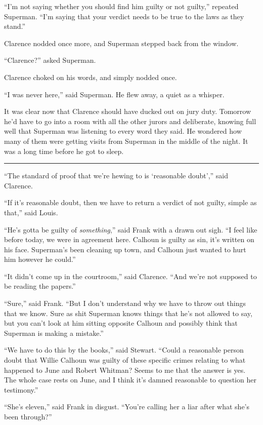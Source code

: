 \documentclass[ebook,12pt]{memoir}
\begin{document}
``I'm not saying whether you should find him guilty or not guilty,''
repeated Superman. ``I'm saying that your verdict needs to be true to
the laws as they stand.''

Clarence nodded once more, and Superman stepped back from the window.

``Clarence?'' asked Superman.

Clarence choked on his words, and simply nodded once.

``I was never here,'' said Superman. He flew away, a quiet as a whisper.

It was clear now that Clarence should have ducked out on jury duty.
Tomorrow he'd have to go into a room with all the other jurors and
deliberate, knowing full well that Superman was listening to every word
they said. He wondered how many of them were getting visits from
Superman in the middle of the night. It was a long time before he got to
sleep.

\begin{center}\rule{0.5\linewidth}{\linethickness}\end{center}

``The standard of proof that we're hewing to is `reasonable doubt',''
said Clarence.

``If it's reasonable doubt, then we have to return a verdict of not
guilty, simple as that,'' said Louis.

``He's gotta be guilty of \emph{something},'' said Frank with a drawn
out sigh. ``I feel like before today, we were in agreement here. Calhoun
is guilty as sin, it's written on his face. Superman's been cleaning up
town, and Calhoun just wanted to hurt him however he could.''

``It didn't come up in the courtroom,'' said Clarence. ``And we're not
supposed to be reading the papers.''

``Sure,'' said Frank. ``But I don't understand why we have to throw out
things that we know. Sure as shit Superman knows things that he's not
allowed to say, but you can't look at him sitting opposite Calhoun and
possibly think that Superman is making a mistake.''

``We have to do this by the books,'' said Stewart. ``Could a reasonable
person doubt that Willie Calhoun was guilty of these specific crimes
relating to what happened to June and Robert Whitman? Seems to me that
the answer is yes. The whole case rests on June, and I think it's damned
reasonable to question her testimony.''

``She's eleven,'' said Frank in disgust. ``You're calling her a liar
after what she's been through?''
\end{document}
